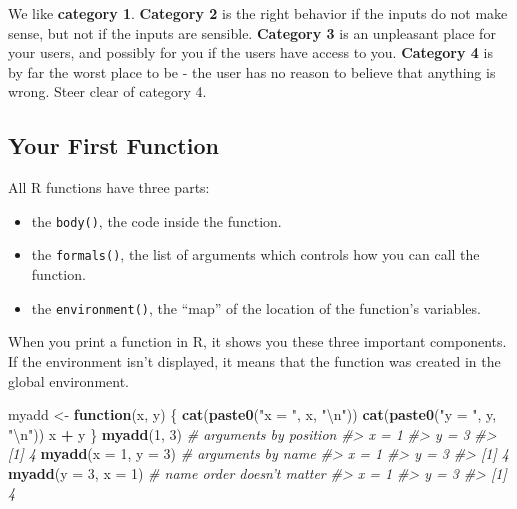\documentclass[]{book}
\newenvironment{Shaded}{\begin{snugshade}}{\end{snugshade}}
\newcommand{\KeywordTok}[1]{\textcolor[rgb]{0.13,0.29,0.53}{\textbf{#1}}}
\newcommand{\DataTypeTok}[1]{\textcolor[rgb]{0.13,0.29,0.53}{#1}}
\newcommand{\DecValTok}[1]{\textcolor[rgb]{0.00,0.00,0.81}{#1}}
\newcommand{\CharTok}[1]{\textcolor[rgb]{0.31,0.60,0.02}{#1}}
\newcommand{\StringTok}[1]{\textcolor[rgb]{0.31,0.60,0.02}{#1}}
\newcommand{\CommentTok}[1]{\textcolor[rgb]{0.56,0.35,0.01}{\textit{#1}}}
\newcommand{\ControlFlowTok}[1]{\textcolor[rgb]{0.13,0.29,0.53}{\textbf{#1}}}
\newcommand{\OperatorTok}[1]{\textcolor[rgb]{0.81,0.36,0.00}{\textbf{#1}}}
\newcommand{\NormalTok}[1]{#1}
\theoremstyle{definition}
\theoremstyle{definition}
\theoremstyle{definition}
\theoremstyle{remark}
\begin{document}
We like \textbf{category 1}. \textbf{Category 2} is the right behavior
if the inputs do not make sense, but not if the inputs are sensible.
\textbf{Category 3} is an unpleasant place for your users, and possibly
for you if the users have access to you. \textbf{Category 4} is by far
the worst place to be - the user has no reason to believe that anything
is wrong. Steer clear of category 4.

\subsection{Your First Function}\label{your-first-function}

All R functions have three parts:

\begin{itemize}
\item
  the \texttt{body()}, the code inside the function.
\item
  the \texttt{formals()}, the list of arguments which controls how you
  can call the function.
\item
  the \texttt{environment()}, the ``map'' of the location of the
  function's variables.
\end{itemize}

When you print a function in R, it shows you these three important
components. If the environment isn't displayed, it means that the
function was created in the global environment.

\begin{Shaded}
\begin{Highlighting}[]
\NormalTok{myadd <-}\StringTok{ }\ControlFlowTok{function}\NormalTok{(x, y) \{}
  \KeywordTok{cat}\NormalTok{(}\KeywordTok{paste0}\NormalTok{(}\StringTok{"x = "}\NormalTok{, x, }\StringTok{"}\CharTok{\textbackslash{}n}\StringTok{"}\NormalTok{))}
  \KeywordTok{cat}\NormalTok{(}\KeywordTok{paste0}\NormalTok{(}\StringTok{"y = "}\NormalTok{, y, }\StringTok{"}\CharTok{\textbackslash{}n}\StringTok{"}\NormalTok{))}
\NormalTok{  x }\OperatorTok{+}\StringTok{ }\NormalTok{y}
\NormalTok{\}}
\KeywordTok{myadd}\NormalTok{(}\DecValTok{1}\NormalTok{, }\DecValTok{3}\NormalTok{)            }\CommentTok{# arguments by position}
\CommentTok{#> x = 1}
\CommentTok{#> y = 3}
\CommentTok{#> [1] 4}
\KeywordTok{myadd}\NormalTok{(}\DataTypeTok{x =} \DecValTok{1}\NormalTok{, }\DataTypeTok{y =} \DecValTok{3}\NormalTok{)    }\CommentTok{# arguments by name}
\CommentTok{#> x = 1}
\CommentTok{#> y = 3}
\CommentTok{#> [1] 4}
\KeywordTok{myadd}\NormalTok{(}\DataTypeTok{y =} \DecValTok{3}\NormalTok{, }\DataTypeTok{x =} \DecValTok{1}\NormalTok{)    }\CommentTok{# name order doesn't matter}
\CommentTok{#> x = 1}
\CommentTok{#> y = 3}
\CommentTok{#> [1] 4}
\end{Highlighting}
\end{Shaded}
\end{document}
